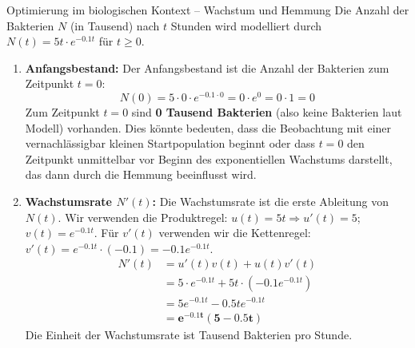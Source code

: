 \begin{loesungsumgebung}{Optimierung im biologischen Kontext – Wachstum und Hemmung}
Die Anzahl der Bakterien $N$ (in Tausend) nach $t$ Stunden wird modelliert durch $N(t) = 5t \cdot e^{-0.1t}$ für $t \ge 0$.

\begin{enumerate}[label=(\alph*)]
    \item \textbf{Anfangsbestand:}
    Der Anfangsbestand ist die Anzahl der Bakterien zum Zeitpunkt $t=0$:
    $$ N(0) = 5 \cdot 0 \cdot e^{-0.1 \cdot 0} = 0 \cdot e^0 = 0 \cdot 1 = 0 $$
    Zum Zeitpunkt $t=0$ sind \textbf{0 Tausend Bakterien} (also keine Bakterien laut Modell) vorhanden. Dies könnte bedeuten, dass die Beobachtung mit einer vernachlässigbar kleinen Startpopulation beginnt oder dass $t=0$ den Zeitpunkt unmittelbar vor Beginn des exponentiellen Wachstums darstellt, das dann durch die Hemmung beeinflusst wird.

    \item \textbf{Wachstumsrate $N'(t)$:}
    Die Wachstumsrate ist die erste Ableitung von $N(t)$. Wir verwenden die Produktregel: $u(t)=5t \Rightarrow u'(t)=5$; $v(t)=e^{-0.1t}$.
    Für $v'(t)$ verwenden wir die Kettenregel: $v'(t) = e^{-0.1t} \cdot (-0.1) = -0.1e^{-0.1t}$.
    \begin{align*}
    N'(t) &= u'(t)v(t) + u(t)v'(t) \\
           &= 5 \cdot e^{-0.1t} + 5t \cdot (-0.1e^{-0.1t}) \\
           &= 5e^{-0.1t} - 0.5te^{-0.1t} \\
           &= \mathbf{e^{-0.1t}(5 - 0.5t)}
    \end{align*}
    Die Einheit der Wachstumsrate ist Tausend Bakterien pro Stunde.


\end{enumerate}
\end{loesungsumgebung}
